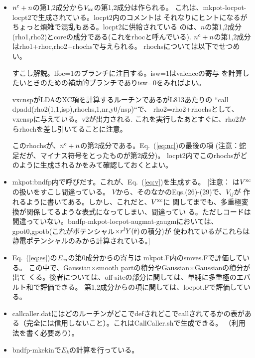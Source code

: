 \documentclass[twocolumn,showpacs,preprintnumbers,amsmath,amssymb,floatfix]{revtex4-1}
\newcommand{\bfr}{{\bf r}}
\newcommand{\req}[1]{\mbox{Eq.~\!(\ref{#1})}}
\begin{document}
\begin{widetext}
\begin{itemize}
\item
$n^{\rm c}+n$の第1,2成分から$V_{\rm xc}$の第1,2成分は作られる。
これは、mkpot-locpot-locpt2で生成されている。locpt2内のコメントは
それなりにヒントになるがちょっと煩雑で混乱もある。locpt2に供給されている
のは、$n$の第1,2成分(rho1,rho2)とcoreの成分である(これをrhocと呼んでいる).
$n^{\rm c}+n$の第1,2成分はrho1+rhoc,rho2+rhochsで与えられる。
rhochsについては以下でせつめい。

すこし解説。lfoc=1のブランチに注目する。isw=1はvalenceの寄与
を計算したいときのための補助的ブランチでありisw=0をみればよい。

vxcnspがLDAのXC項を計算するルーチンであるがL813あたりの
``call dpadd(rho2(1,1,isp),rhochs,1,nr,y0/nsp)``で、
rho2=rho2+rhochsとして、vxcnspに与えている。v2が出力される.
これを実行したあとすぐに、rho2からrhochを差し引いてることに注意。

このrhochsが、$n^{\rm c}+n$の第2成分である。\req{eq:nc}の最後の項
(注意：蛇足だが、マイナス符号をとったものが第2成分)。
locpt2内でこのrhochsがどのように生成されるかをみて確認しておくとよい。

\item
mkpot:bndfp内で呼びだす。これが、\req{eq:v}を生成する。
[注意： \cite{lmfchap}は$V^{\rm xc}$の扱いをすこし間違っている。
$V$から、そのなかのEqs.(26)-(29)で、$V_{ij}$が
作れるように書いてある。しかし、これだと、$V^{\rm xc}$に
関してまでも、多重極変換が関係してるような表式になってしまい、間違ってい
る。ただしコードは間違っていない。bndfp-mkpot-locpot-augmat-gaugmにおいては、
gpot0,gpotb(これがポテンシャル$\times r^l Y(\hat{\bfr})$の積分)が
使われているがこれらは静電ポテンシャルのみから計算されている。]

\item
\req{eq:es}の$E_{\rm es}$の第0成分からの寄与は
mkpot.F内のsmves.Fで評価している。
この中で、Gaussian$\times$smooth partの積分やGaussian$\times$Gaussianの積分が出て
くる。後者については、off-siteの部分に関しては、単純に多重極のエバルト和で評価できる。
第1,2成分からの項に関しては、locpot.Fで評価している。\\

\item
callcaller.datにはどのルーチンがどこでdefされどこでcallされてるかの表があ
る（完全には信用しないこと）。これはCallCaller.shで生成できる。
（利用法を書く必要あり）。\\

\item
bndfp-mkekinで$E_k$の計算を行っている。


\end{itemize}
\end{widetext}


\end{document}
